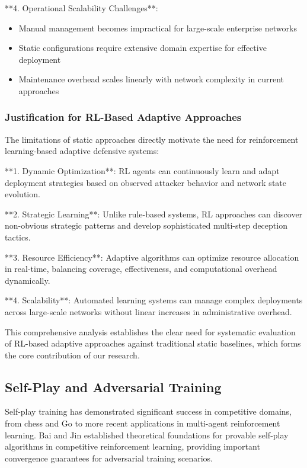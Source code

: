\documentclass[12pt,twoside]{article}
\theoremstyle{definition}
\theoremstyle{plain}
\begin{document}
**4. Operational Scalability Challenges**:
\begin{itemize}
\item Manual management becomes impractical for large-scale enterprise networks
\item Static configurations require extensive domain expertise for effective deployment
\item Maintenance overhead scales linearly with network complexity in current approaches
\end{itemize}

\subsubsection{Justification for RL-Based Adaptive Approaches}

The limitations of static approaches directly motivate the need for reinforcement learning-based adaptive defensive systems:

**1. Dynamic Optimization**: RL agents can continuously learn and adapt deployment strategies based on observed attacker behavior and network state evolution.

**2. Strategic Learning**: Unlike rule-based systems, RL approaches can discover non-obvious strategic patterns and develop sophisticated multi-step deception tactics.

**3. Resource Efficiency**: Adaptive algorithms can optimize resource allocation in real-time, balancing coverage, effectiveness, and computational overhead dynamically.

**4. Scalability**: Automated learning systems can manage complex deployments across large-scale networks without linear increases in administrative overhead.

This comprehensive analysis establishes the clear need for systematic evaluation of RL-based adaptive approaches against traditional static baselines, which forms the core contribution of our research.

\subsection{Self-Play and Adversarial Training}

Self-play training has demonstrated significant success in competitive domains, from chess and Go to more recent applications in multi-agent reinforcement learning. Bai and Jin \cite{bai2020provable} established theoretical foundations for provable self-play algorithms in competitive reinforcement learning, providing important convergence guarantees for adversarial training scenarios.
\end{document}
